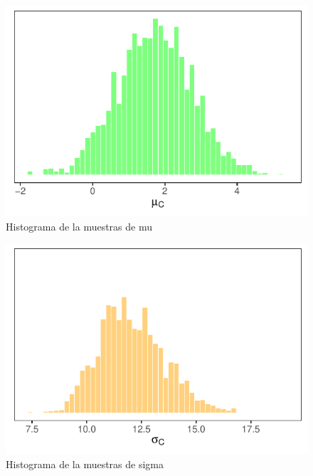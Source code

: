 \documentclass[
]{article}
\begin{document}
\begin{figure}

{\centering \includegraphics{TP-2---El-Dibu-de-la-vida_files/figure-latex/f25-1} 

}

\caption{Histograma de la muestras de mu}\label{fig:f25}
\end{figure}

\begin{figure}

{\centering \includegraphics{TP-2---El-Dibu-de-la-vida_files/figure-latex/f26-1} 

}

\caption{Histograma de la muestras de sigma}\label{fig:f26}
\end{figure}
\end{document}
